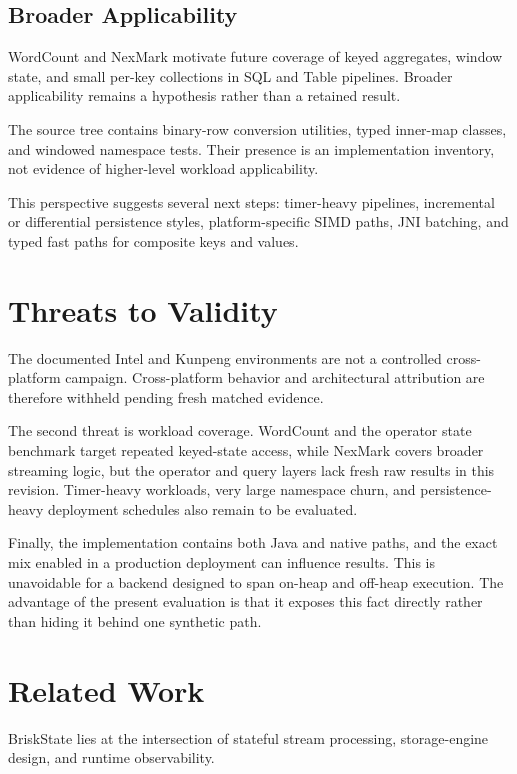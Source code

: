 \documentclass[journal]{IEEEtran}
\newcommand{\briskstate}{BriskState\xspace}
\newcommand{\system}{\briskstate}
\begin{document}
\subsection{Broader Applicability}

WordCount and NexMark motivate future coverage of keyed aggregates, window state, and small per-key collections in SQL and Table pipelines. Broader applicability remains a hypothesis rather than a retained result.

The source tree contains binary-row conversion utilities, typed inner-map classes, and windowed namespace tests. Their presence is an implementation inventory, not evidence of higher-level workload applicability.

This perspective suggests several next steps: timer-heavy pipelines, incremental or differential persistence styles, platform-specific SIMD paths, JNI batching, and typed fast paths for composite keys and values.

\section{Threats to Validity}

The documented Intel and Kunpeng environments are not a controlled cross-platform campaign. Cross-platform behavior and architectural attribution are therefore withheld pending fresh matched evidence.

The second threat is workload coverage. WordCount and the operator state benchmark target repeated keyed-state access, while NexMark covers broader streaming logic, but the operator and query layers lack fresh raw results in this revision. Timer-heavy workloads, very large namespace churn, and persistence-heavy deployment schedules also remain to be evaluated.

Finally, the implementation contains both Java and native paths, and the exact mix enabled in a production deployment can influence results. This is unavoidable for a backend designed to span on-heap and off-heap execution. The advantage of the present evaluation is that it exposes this fact directly rather than hiding it behind one synthetic path.

\section{Related Work}

\system lies at the intersection of stateful stream processing, storage-engine design, and runtime observability.
\end{document}
